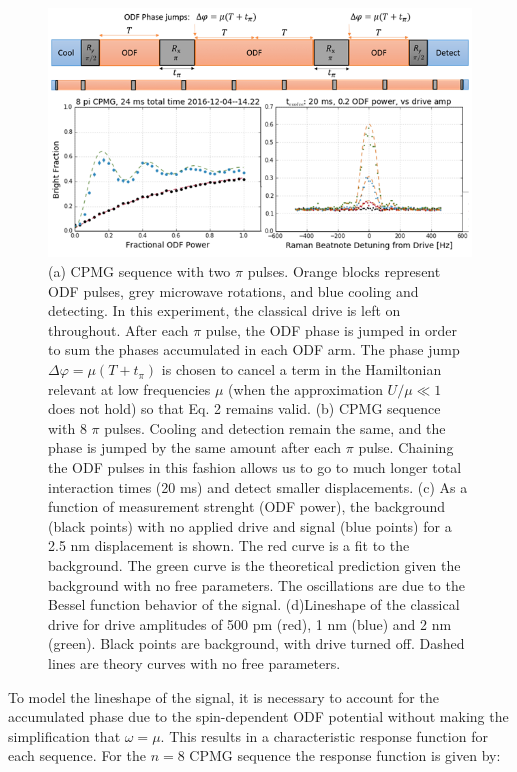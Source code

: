 \documentclass[aps,prl,twocolumn,superscriptaddress,floatfix]{revtex4-1}
\begin{document}
\fi
\begin{figure}
    \centering
    \includegraphics[width=.8\textwidth]{amp_sensing}
  \caption{(a) CPMG sequence with two $\pi$ pulses. Orange blocks represent ODF pulses, grey microwave rotations, and blue cooling and detecting. In this experiment, the classical drive is left on throughout. After each $\pi$ pulse, the ODF phase is jumped in order to sum the phases accumulated in each ODF arm. The phase jump $\Delta\varphi = \mu(T+t_{\pi})$ is chosen to cancel a term in the Hamiltonian relevant at low frequencies $\mu$ (when the approximation  $U/\mu \ll 1$ does not hold) so that Eq. 2 remains valid. (b) CPMG sequence with 8 $\pi$ pulses. Cooling and detection remain the same, and the phase is jumped by the same amount after each $\pi$ pulse. Chaining the ODF pulses in this fashion allows us to go to much longer total interaction times (20 ms) and detect smaller displacements. (c) As a function of measurement strenght (ODF power), the background (black points) with no applied drive and signal (blue points) for a 2.5 nm displacement is shown. The red curve is a fit to the background. The green curve is the theoretical prediction given the background with no free parameters. The oscillations are due to the Bessel function behavior of the signal. (d)Lineshape of the classical drive for drive amplitudes of 500 pm (red), 1 nm (blue) and 2 nm (green). Black points are background, with drive turned off. Dashed lines are theory curves with no free parameters.}\label{Fig Ramsey}
\end{figure}
To model the lineshape of the signal, it is necessary to account for the accumulated phase due to the spin-dependent ODF potential without making the simplification that $ \omega = \mu $. This results in a characteristic response function for each sequence. For the $n = 8$ CPMG sequence the response function is given by:
\end{document}
